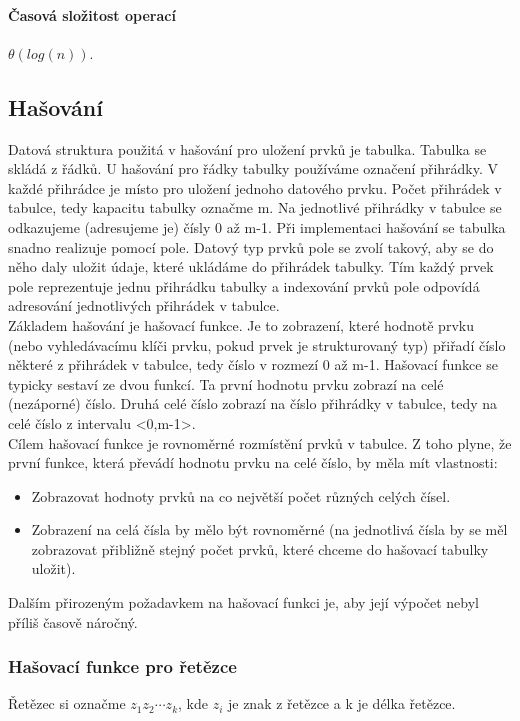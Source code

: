 \documentclass[10pt,a4paper]{article}
\begin{document}
\paragraph{Časová složitost operací} $\theta(log(n))$.




\subsection{Hašování}
Datová struktura použitá v hašování pro uložení prvků je tabulka. Tabulka se skládá z řádků. U hašování pro řádky tabulky používáme označení přihrádky. V každé přihrádce je místo pro uložení jednoho datového prvku. Počet přihrádek v tabulce, tedy kapacitu tabulky označme m. Na jednotlivé přihrádky v tabulce se odkazujeme (adresujeme je) čísly 0 až m-1. Při implementaci hašování se tabulka snadno realizuje pomocí pole. Datový typ prvků pole se zvolí takový, aby se do něho daly uložit údaje, které ukládáme do přihrádek tabulky. Tím každý prvek pole reprezentuje jednu přihrádku tabulky a indexování prvků pole odpovídá adresování jednotlivých přihrádek v tabulce. \\
Základem hašování je hašovací funkce. Je to zobrazení, které hodnotě prvku (nebo vyhledávacímu klíči prvku, pokud prvek je strukturovaný typ) přiřadí číslo některé z přihrádek v tabulce, tedy číslo v rozmezí 0 až m-1. Hašovací funkce se typicky sestaví ze dvou funkcí. Ta první hodnotu prvku zobrazí na celé (nezáporné) číslo. Druhá celé číslo zobrazí na číslo přihrádky v tabulce, tedy na celé číslo z intervalu <0,m-1>. \\
Cílem hašovací funkce je rovnoměrné rozmístění prvků v tabulce. Z toho plyne, že první funkce, která převádí hodnotu prvku na celé číslo, by měla mít vlastnosti:
\begin{itemize}
	\item Zobrazovat hodnoty prvků na co největší počet různých celých čísel.
	\item Zobrazení na celá čísla by mělo být rovnoměrné (na jednotlivá čísla by se měl zobrazovat přibližně stejný počet prvků, které chceme do hašovací tabulky uložit).
\end{itemize}
Dalším přirozeným požadavkem na hašovací funkci je, aby její výpočet nebyl příliš časově náročný.
\subsubsection{Hašovací funkce pro řetězce}
Řetězec si označme $z_1 z_2 \cdots z_k$, kde $z_i$ je znak z řetězce a k je délka řetězce.
\end{document}
